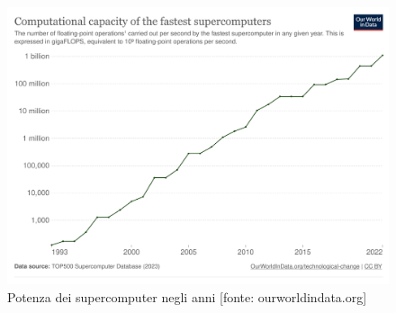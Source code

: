 \begin{figure}[ht]
\centering
\includegraphics[width=.95\linewidth]{images/chapter1/supercomputer_flops.png}
\caption{Potenza dei supercomputer negli anni [fonte: ourworldindata.org]}
\label{fig:supercomputer_flops}
\end{figure}


